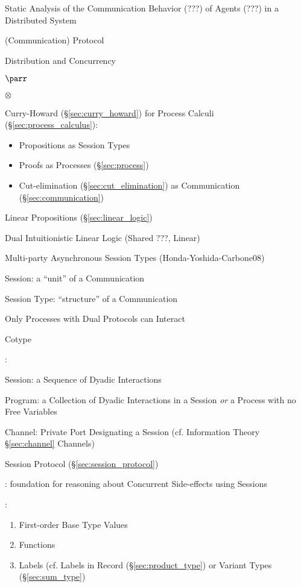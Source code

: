 Static Analysis of the Communication Behavior (???) of Agents (???) in
a Distributed System \cite{gay-vasconcelos10}

(Communication) Protocol

Distribution and Concurrency

$\parr$

$\otimes$

Curry-Howard (\S\ref{sec:curry_howard}) for Process Calculi
(\S\ref{sec:process_calculus}):
\begin{itemize}
  \item Propositions as Session Types
  \item Proofs as Processes (\S\ref{sec:process})
  \item Cut-elimination (\S\ref{sec:cut_elimination}) as Communication
    (\S\ref{sec:communication})
\end{itemize}

Linear Propositions (\S\ref{sec:linear_logic})

Dual Intuitionistic Linear Logic \cite{caires-pfenning10} (Shared ???,
Linear)

Multi-party Asynchronous Session Types (Honda-Yoshida-Carbone08)

Session: a ``unit'' of a Communication

Session Type: ``structure'' of a Communication

Only Processes with Dual Protocols can Interact

Cotype


\cite{honda-vasconcelos-kubo98}:

Session: a Sequence of Dyadic Interactions

Program: a Collection of Dyadic Interactions in a Session \emph{or} a
Process with no Free Variables %

Channel: Private Port Designating a Session (cf. Information Theory
\S\ref{sec:channel} Channels)

Session Protocol (\S\ref{sec:session_protocol})


\cite{orchard-yoshida15}: foundation for reasoning about Concurrent
Side-effects using Sessions


\cite{neubauer-thiemann04}:
\begin{enumerate}
  \item First-order Base Type Values
  \item Functions
  \item Labels (cf. Labels in Record (\S\ref{sec:product_type}) or
    Variant Types (\S\ref{sec:sum_type})
\end{enumerate}


